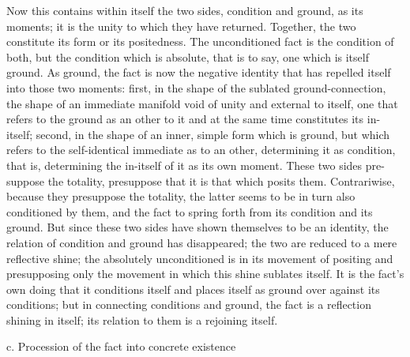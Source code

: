 Now this contains within itself the two sides,
condition and ground, as its moments;
it is the unity to which they have returned.
Together, the two constitute its form or its positedness.
The unconditioned fact is the condition of both,
but the condition which is absolute, that is to say,
one which is itself ground.
As ground, the fact is now the negative identity
that has repelled itself into those two moments:
first, in the shape of the sublated ground-connection,
the shape of an immediate manifold void of
unity and external to itself,
one that refers to the ground as an other to it
and at the same time constitutes its in-itself;
second, in the shape of an inner, simple form which is ground,
but which refers to the self-identical
immediate as to an other, determining it as condition,
that is, determining the in-itself of it as its own moment.
These two sides pre-suppose the totality,
presuppose that it is that which posits them.
Contrariwise, because they presuppose the totality,
the latter seems to be in turn also conditioned by them,
and the fact to spring forth from its condition and its ground.
But since these two sides have shown themselves to be an identity,
the relation of condition and ground has disappeared;
the two are reduced to a mere reflective shine;
the absolutely unconditioned is in its movement of positing
and presupposing only the movement in which this shine sublates itself.
It is the fact's own doing that it conditions itself
and places itself as ground over against its conditions;
but in connecting conditions and ground,
the fact is a reflection shining in itself;
its relation to them is a rejoining itself.

c. Procession of the fact into concrete existence

